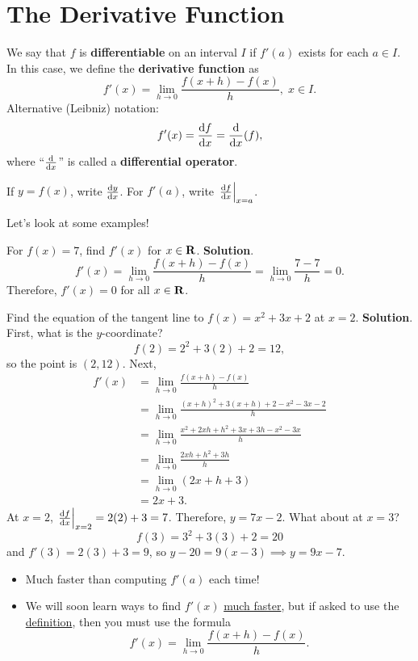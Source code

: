 \section{The Derivative Function}
\begin{Definition}{}{}
    We say that $ f $ is \textbf{differentiable} on an interval $ I $ if $ f'(a) $ exists
    for each $ a\in I $. In this case, we define the \textbf{derivative function} as
    \[ f'(x)=\lim\limits_{{h} \to {0}}\frac{f(x+h)-f(x)}{h},\; x\in I. \]
    Alternative (Leibniz) notation:
    \[ f'(x)=\odv{f}{x}=\odv*{(f)}{x}, \]
    where ``$\odv{}{x}$'' is called a \textbf{differential operator}.

    If $ y=f(x) $, write $ \odv{y}{x} $. For $ f'(a) $, write $ \odv{f}{x}_{x=a} $.
\end{Definition}
Let's look at some examples!
\begin{Example}{}{}
    For $ f(x)=7 $, find $ f'(x) $ for $ x\in\mathbf{R} $.
    \tcblower{}
    \textbf{Solution}.
    \[ f'(x)=\lim\limits_{{h} \to {0}}\frac{f(x+h)-f(x)}{h}=\lim\limits_{{h} \to {0}}\frac{7-7}{h}=0. \]
    Therefore, $ f'(x)=0 $ for all $ x\in\mathbf{R} $.
\end{Example}
\begin{Example}{}{}
    Find the equation of the tangent line to $ f(x)=x^2+3x+2 $ at $ x=2 $.
    \tcblower{}
    \textbf{Solution}. First, what is the $ y $-coordinate?
    \[ f(2)=2^2+3(2)+2=12, \]
    so the point is $ (2,12) $. Next,
    \begin{align*}
        f'(x)
         & =\lim\limits_{{h} \to {0}}\frac{f(x+h)-f(x)}{h}               \\
         & =\lim\limits_{{h} \to {0}}\frac{(x+h)^2+3(x+h)+2-x^2-3x-2}{h} \\
         & =\lim\limits_{{h} \to {0}}\frac{x^2+2xh+h^2+3x+3h-x^2-3x}{h}  \\
         & =\lim\limits_{{h} \to {0}}\frac{2xh+h^2+3h}{h}                \\
         & =\lim\limits_{{h} \to {0}}(2x+h+3)                            \\
         & =2x+3.
    \end{align*}
    At $ x=2 $, $ \odv{f}{x}_{x=2}=2(2)+3=7 $. Therefore,
    $ y=7x-2 $. What about at $ x=3 $?
    \[ f(3)=3^2+3(3)+2=20 \]
    and $ f'(3)=2(3)+3=9 $, so $ y-20=9(x-3)\implies y=9x-7 $.
\end{Example}
\begin{Remark}{}{}
    \begin{itemize}
        \item Much faster than computing $ f'(a) $ each time!
        \item We will soon learn ways to find $ f'(x) $ \underline{much faster}, but if asked to use the
              \underline{definition}, then you must use the formula
              \[ f'(x)=\lim\limits_{{h} \to {0}}\frac{f(x+h)-f(x)}{h}. \]
    \end{itemize}
\end{Remark}
